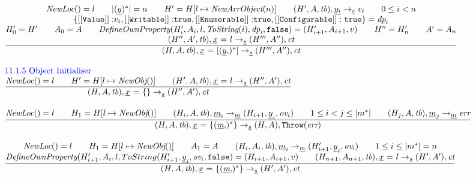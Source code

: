 \documentclass[a4paper, leqno]{amsart}
\newcommand{\rulesep}{\quad\quad}
\newcommand{\stmt}{s}
\newcommand{\expr}{e}
\newcommand{\member}{\emph{m}}
\newcommand{\ir}[1]{\ensuremath{\underline{#1}}}
\newcommand{\irid}{\ir{x}}
\def\inblue{\color{blue}}
\newcommand{\false}{{\tt false}}
\newcommand{\true}{{\tt true}}
\newcommand{\tb}{\emph{tb}}
\newcommand{\err}{\emph{err}}
\newcommand{\ct}{\emph{ct}}
\newcommand{\hf}[1]{\emph{#1}}
\newcommand{\error}{\ensuremath{{\tt Throw}(\err)}}
\newcommand{\state}{\ensuremath{(H,A,\tb)}}
\newcommand{\res}{\ensuremath{(H,A)}}
\newcommand{\resp}{\ensuremath{(H',A')}}
\newcommand{\irobj}{\ensuremath{\irid \ {\tt =} \ {\tt\{} (\ir\member{\tt,})^* {\tt\}}}}
\newcommand{\irarr}{\ensuremath{\irid \ {\tt =} \ {\tt[} (\ir
{y}{\tt,})^* {\tt]}}}
\def\inblue{\color{blue}}
\begin{document}
\[\begin{array}{l@{~~}l@{~~}ll}
\frac{\begin{matrix}
\hf{NewLoc}() = l
\rulesep
|(\ir{y})^*| = n
\rulesep
H' = H[l \mapsto \hf{NewArrObject}(n)]
\rulesep
(H',A,\tb), \ir{y_i} \rightarrow_{\ir\expr} v_i
\rulesep
0 \le i < n
\\
\{{\tt [[Value]]:}v_i, {\tt [[Writable]]:}\true, {\tt [[Enumerable]]:}\true,
 {\tt [[Configurable]]:\true}\} = \emph{dp}_i
\\
H'_0 = H'
\rulesep
A_0 = A
\rulesep
\hf{DefineOwnProperty}(H'_i,A_i,l,\hf{ToString}(i)
, \emph{dp}_i, \false) = (H'_{i+1},A_{i+1},v)
\rulesep
H'' = H'_{n}
\rulesep
A' = A_{n}
\\
(H'',A',\tb), \irid \ {\tt =} \ l \rightarrow_{\ir\stmt} (H''',A''), \ct
\end{matrix}}{\begin{matrix}
\state, \irarr \rightarrow_{\ir\stmt} (H''',A''), \ct
\end{matrix}}
\\\\



\mbox{\inblue 11.1.5 Object Initialiser}\\
\frac{\begin{matrix}
\hf{NewLoc}() = l
\rulesep
H' = H[l\mapsto \hf{NewObj}()]
\rulesep
(H',A,\tb), \irid \ {\tt =} \ l \rightarrow_{\ir\stmt} (H'',A'), \ct
\end{matrix}}{\begin{matrix}
\state, \irid \ {\tt =} \ {\tt\{\}} \rightarrow_{\ir\stmt} (H'',A'), \ct
\end{matrix}}
\\[2em]

\frac{\begin{matrix}
\hf{NewLoc}() = l
\rulesep
H_1 = H[l\mapsto \hf{NewObj}()]
\rulesep
(H_i, A, \tb), \ir{m}_i \rightarrow_{\ir{m}} (H_{i+1}, \ir{y}_i, \emph{ov}_i)
\rulesep
1 \le i < j \le |m^*|
\rulesep
(H_j, A, \tb), \ir{m}_j \rightarrow_{\ir{m}} \err
\end{matrix}}{\begin{matrix}
\state, \irobj \rightarrow_{\ir\stmt} \res, \error
\end{matrix}}
\\[2em]

\frac{\begin{matrix}
\hf{NewLoc}() = l
\rulesep
H_1 = H[l\mapsto \hf{NewObj}()]
\rulesep
A_1 = A
\rulesep
(H_i, A_i, \tb), \ir{m}_i \rightarrow_{\ir{m}} (H'_{i+1}, \ir{y}_i, \emph{ov}_i)
\rulesep
1 \le i \le |m^*| = n
\\
\hf{DefineOwnProperty}(H'_{i+1},A_{i},  l, ToString(H'_{i+1}, \ir{y}_i, \emph{ov}_i, \false) = (H_{i+1}, A_{i+1}, v)
\rulesep
(H_{n+1},A_{n+1},\tb), \irid \ {\tt =} \ l \rightarrow_{\ir\stmt} \resp, \ct
\end{matrix}}{\begin{matrix}
\state, \irobj \rightarrow_{\ir\stmt} \resp, \ct
\end{matrix}}
\\\\


\end{array}\]
\end{document}
